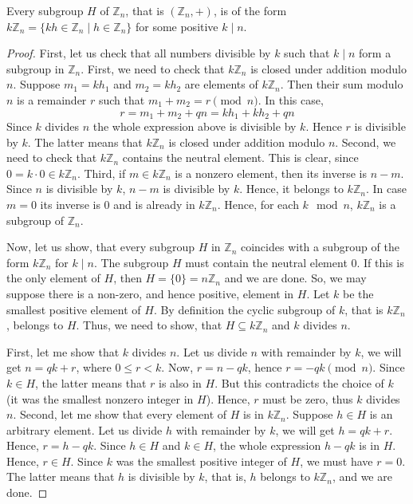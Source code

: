 \begin{claim}
\label{claim::Znsubgroups}
Every subgroup $H$ of $\mathbb Z_n$, that is $(\mathbb Z_n, +)$, is of the form $k\mathbb Z_n =\{kh\in \mathbb Z_n \mid h\in \mathbb Z_n\}$ for some positive $k \mid n$.
\end{claim}
\begin{proof}
First, let us check that all numbers divisible by $k$ such that $k\mid n$ form a subgroup in $\mathbb Z_n$.
First, we need to check that $k\mathbb Z_n$ is closed under addition modulo $n$.
Suppose $m_1 = k h_1$ and $m_2 = k h_2$ are elements of $k \mathbb Z_n$.
Then their sum modulo $n$ is a remainder $r$ such that $ m_1+ m_2 = r \pmod{n}$.
In this case,
\[
r = m_1 + m_2 + q n = k h_1 + kh_2 + qn
\]
Since $k$ divides $n$ the whole expression above is divisible by $k$.
Hence $r$ is divisible by $k$.
The latter means that $k \mathbb Z_n$ is closed under addition modulo $n$.
Second, we need to check that $k\mathbb Z_n$ contains the neutral element.
This is clear, since $0 = k \cdot 0\in k\mathbb Z_n$.
Third, if $m\in k\mathbb Z_n$ is a nonzero element, then its inverse is $n - m$.
Since $n$ is divisible by $k$, $n-m$ is divisible by $k$.
Hence, it belongs to $k\mathbb Z_n$.
In case $m = 0$ its inverse is $0$ and is already in $k \mathbb Z_n$.
Hence, for each $k\mod n$, $k\mathbb Z_n$ is a subgroup of $\mathbb Z_n$.

Now, let us show, that every subgroup $H$ in $\mathbb Z_n$ coincides with a subgroup of the form $k\mathbb Z_n$ for $k\mid n$.
The subgroup $H$ must contain the neutral element $0$.
If this is the only element of $H$, then $H = \{0\} = n \mathbb Z_n$ and we are done.
So, we may suppose there is a non-zero, and hence positive, element in $H$.
Let $k$ be the smallest positive element of $H$.
By definition the cyclic subgroup of $k$, that is $k\mathbb Z_n$, belongs to $H$.
Thus, we need to show, that $H\subseteq k \mathbb Z_n$ and $k$ divides $n$.

First, let me show that $k$ divides $n$.
Let us divide $n$ with remainder by $k$, we will get $n = qk + r$, where $0\leqslant r < k$.
Now, $r = n - q k$, hence $r = -q k \pmod{n}$.
Since $k\in H$, the latter means that $r$ is also in $H$.
But this contradicts the choice of $k$ (it was the smallest nonzero integer in $H$).
Hence, $r$ must be zero, thus $k$ divides $n$.
Second, let me show that every element of $H$ is in $k\mathbb Z_n$.
Suppose $h\in H$ is an arbitrary element.
Let us divide $h$ with remainder by $k$, we will get $h = q k + r$.
Hence, $r = h - q k$.
Since $h\in H$ and $k\in H$, the whole expression $h - qk$ is in $H$.
Hence, $r\in H$.
Since $k$ was the smallest positive integer of $H$, we must have $r = 0$.
The latter means that $h$ is divisible by $k$, that is, $h$ belongs to $k\mathbb Z_n$, and we are done.
\end{proof}

